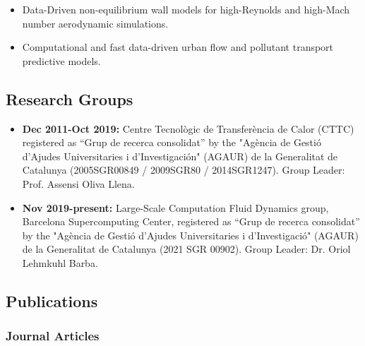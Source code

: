 \documentclass{article}
\begin{document}
\begin{itemize}
\item Data-Driven non-equilibrium wall models for high-Reynolds and high-Mach number aerodynamic simulations.
\item Computational and fast data-driven urban flow and pollutant transport predictive models. 
\end{itemize}

\subsection{Research Groups}

\begin{itemize}
\item {\bf Dec 2011-Oct 2019:} Centre Tecnològic de Transferència de Calor (CTTC) registered as “Grup de recerca consolidat” by the "Agència de Gestió d'Ajudes Universitaries i d'Investigación" (AGAUR) de la Generalitat de Catalunya (2005SGR00849 / 2009SGR80 / 2014SGR1247). Group Leader: Prof. Assensi Oliva Llena. 

\item {\bf Nov 2019-present:} Large-Scale Computation Fluid Dynamics group, Barcelona Supercomputing Center, registered as “Grup de recerca consolidat” by the "Agència de Gestió d'Ajudes Universitaries i d'Investigació" (AGAUR) de la Generalitat de Catalunya (2021 SGR 00902). Group Leader: Dr. Oriol Lehmkuhl Barba.

\end{itemize}

\subsection{Publications}
\subsubsection{Journal Articles}
\end{document}
